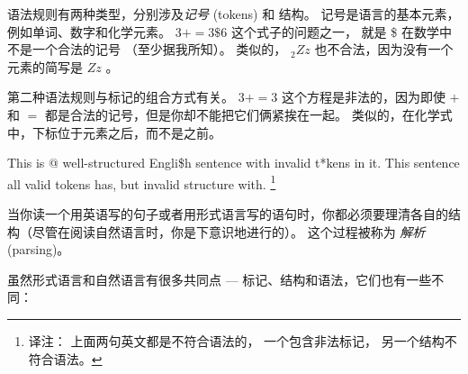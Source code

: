 语法规则有两种类型，分别涉及{\em 记号} (tokens) 和 结构。  
记号是语言的基本元素，例如单词、数字和化学元素。  
$3 + = 3 \$ 6$ 这个式子的问题之一， 
就是 \$ 在数学中不是一个合法的记号 （至少据我所知）。  
类似的， $_2Zz$ 也不合法，因为没有一个元素的简写是  $Zz$ 。

  
  


第二种语法规则与标记的组合方式有关。  $3 + = 3$ 这个方程是非法的，因为即使 $+$ 和 $=$ 都是合法的记号，但是你却不能把它们俩紧挨在一起。 类似的，在化学式中，下标位于元素之后，而不是之前。

This is @ well-structured Engli\$h
sentence with invalid t*kens in it.  This sentence all valid tokens
has, but invalid structure with.
\footnote{译注： 上面两句英文都是不符合语法的， 一个包含非法标记， 另一个结构不符合语法。 }


当你读一个用英语写的句子或者用形式语言写的语句时，你都必须要理清各自的结构（尽管在阅读自然语言时，你是下意识地进行的）。 这个过程被称为 {\em 解析} (parsing)。

  


虽然形式语言和自然语言有很多共同点 --- 标记、结构和语法，它们也有一些不同：

    


